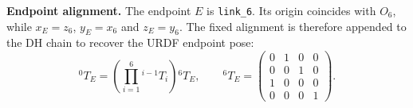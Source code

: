 \textbf{Endpoint alignment.}
The endpoint $E$ is \texttt{link\_6}. Its origin coincides with $O_6$, while
$x_E=z_6$, $y_E=x_6$ and $z_E=y_6$. The fixed alignment is therefore appended
to the DH chain to recover the URDF endpoint pose:
\begin{equation}
 {}^0T_E=\left(\prod_{i=1}^{6}{}^{i-1}\!T_i\right){}^6T_E,
 \qquad
 {}^6T_E=\begin{pmatrix}
 0&1&0&0\\0&0&1&0\\1&0&0&0\\0&0&0&1
 \end{pmatrix}.
 \label{eq:dh-tool}
\end{equation}
